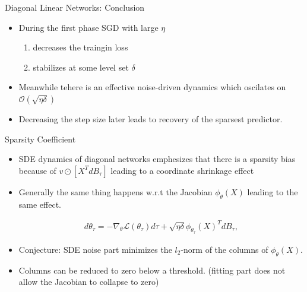 \documentclass[fleqn]{beamer}
\begin{document}
    \begin{frame}{Diagonal Linear Networks: Conclusion}
        \begin{itemize}
            \item During the first phase SGD with large $\eta$
                \begin{enumerate}
                    \item decreases the traingin loss
                    \item stabilizes at some level set $\delta$
                \end{enumerate}
            \item Meanwhile tehere is an effective noise-driven dynamics
                which oscilates on $\mathcal{O}(\sqrt{\eta\delta})$
            \item Decreasing the step size later leads to recovery of the
                sparsest predictor.
        \end{itemize}
    \end{frame}

    \begin{frame}{Sparsity Coefficient}
         \begin{itemize}
             \item SDE dynamics of diagonal networks emphesizes that there is
                 a sparsity bias because of $v \odot [X^{T}dB_\tau]$ leading
                 to a coordinate shrinkage effect
            \item Generally the same thing happens w.r.t the Jacobian
                $\phi_\theta(X)$ leading to the same effect.
            \begin{center}
            \begin{minipage}{0.5\textwidth}
                \begin{align*}
                    d\theta_\tau = -\nabla_\theta \mathcal{L}(\theta_\tau)d\tau
                    + \sqrt{\eta\delta}
                    \phi_{\theta_\tau}\left(X\right)^{T}dB_\tau,
                \end{align*}
            \end{minipage}
            \end{center}
            \item Conjecture: SDE noise part minimizes the $l_{2}$-norm of
                the columns of $\phi_\theta(X)$.

            \item Columns can be reduced to zero below a threshold. (fitting
                part does not allow the Jacobian to collapse to zero)
         \end{itemize}
    \end{frame}
\end{document}
